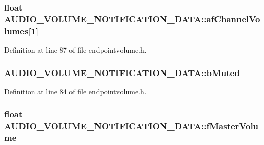 \subsubsection[{\texorpdfstring{af\+Channel\+Volumes}{afChannelVolumes}}]{\setlength{\rightskip}{0pt plus 5cm}float A\+U\+D\+I\+O\+\_\+\+V\+O\+L\+U\+M\+E\+\_\+\+N\+O\+T\+I\+F\+I\+C\+A\+T\+I\+O\+N\+\_\+\+D\+A\+T\+A\+::af\+Channel\+Volumes\mbox{[}1\mbox{]}}\hypertarget{struct_a_u_d_i_o___v_o_l_u_m_e___n_o_t_i_f_i_c_a_t_i_o_n___d_a_t_a_a2d1ddb99e19caa06f2057a462c6b75fc}{}\label{struct_a_u_d_i_o___v_o_l_u_m_e___n_o_t_i_f_i_c_a_t_i_o_n___d_a_t_a_a2d1ddb99e19caa06f2057a462c6b75fc}


Definition at line 87 of file endpointvolume.\+h.

\subsubsection[{\texorpdfstring{b\+Muted}{bMuted}}]{ A\+U\+D\+I\+O\+\_\+\+V\+O\+L\+U\+M\+E\+\_\+\+N\+O\+T\+I\+F\+I\+C\+A\+T\+I\+O\+N\+\_\+\+D\+A\+T\+A\+::b\+Muted}\hypertarget{struct_a_u_d_i_o___v_o_l_u_m_e___n_o_t_i_f_i_c_a_t_i_o_n___d_a_t_a_ae432d9e04d50f86f3d5a0e37d71b4e6a}{}\label{struct_a_u_d_i_o___v_o_l_u_m_e___n_o_t_i_f_i_c_a_t_i_o_n___d_a_t_a_ae432d9e04d50f86f3d5a0e37d71b4e6a}


Definition at line 84 of file endpointvolume.\+h.

\subsubsection[{\texorpdfstring{f\+Master\+Volume}{fMasterVolume}}]{\setlength{\rightskip}{0pt plus 5cm}float A\+U\+D\+I\+O\+\_\+\+V\+O\+L\+U\+M\+E\+\_\+\+N\+O\+T\+I\+F\+I\+C\+A\+T\+I\+O\+N\+\_\+\+D\+A\+T\+A\+::f\+Master\+Volume}\hypertarget{struct_a_u_d_i_o___v_o_l_u_m_e___n_o_t_i_f_i_c_a_t_i_o_n___d_a_t_a_ac5d2d81abd79dfcaa21b8695621c80d3}{}\label{struct_a_u_d_i_o___v_o_l_u_m_e___n_o_t_i_f_i_c_a_t_i_o_n___d_a_t_a_ac5d2d81abd79dfcaa21b8695621c80d3}


